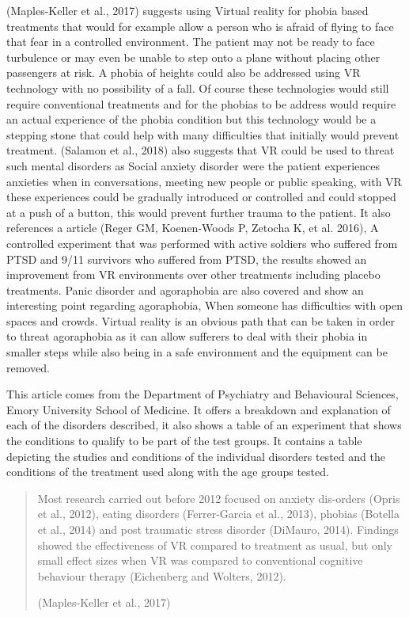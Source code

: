 \documentclass[10pt,journal,compsoc]{IEEEtran}
\begin{document}
	 (Maples-Keller et al., 2017) suggests using Virtual reality for phobia based treatments that would for example allow a person who is afraid of flying to face that fear in a controlled environment. The patient may not be ready to face turbulence or may even be unable to step onto a plane without placing other passengers at risk. A phobia of heights could also be addressed using VR technology with no possibility of a fall. Of course these technologies would still require conventional treatments and for the phobias to be address would require an actual experience of the phobia condition but this technology would be a stepping stone that could help with many difficulties that initially would prevent treatment. (Salamon et al., 2018) also suggests that VR could be used to threat such mental disorders as Social anxiety disorder were the patient experiences anxieties when in conversations, meeting new people or public speaking, with VR these experiences could be  gradually introduced or controlled and could stopped at a push of a button, this would prevent further trauma to the patient. It also references a article (Reger GM, Koenen-Woods P, Zetocha K, et al. 2016), A controlled experiment that was performed with active soldiers who suffered from PTSD and 9/11 survivors who suffered from PTSD, the results showed an improvement from VR environments over other treatments including placebo treatments. Panic disorder and agoraphobia are also covered and show an interesting point regarding agoraphobia, When someone has difficulties with open spaces and crowds. Virtual reality is an obvious path that can be taken in order to threat agoraphobia as it can allow sufferers to deal with their phobia in smaller steps while also being in a safe environment and the equipment can be removed. \newline
	 
	 This article comes from the Department of Psychiatry and Behavioural Sciences, Emory University School of Medicine. It offers a breakdown and explanation of each of the disorders described, it also shows a table of an experiment that shows the conditions to qualify to be part of the test groups. It contains a table depicting the studies and conditions of the individual disorders tested and the conditions of the treatment used along with the age groups tested. \newline

	\begin{quotation}
		 Most research carried out before 2012 focused on anxiety dis-orders (Opris et al., 2012), eating disorders (Ferrer-Garcia et al., 2013), phobias (Botella et al., 2014) and post traumatic stress disorder (DiMauro, 2014). Findings showed the effectiveness of VR compared to treatment as usual, but only small effect sizes when VR was compared to conventional cognitive behaviour therapy (Eichenberg and Wolters, 2012).\newline 
		 
		 (Maples-Keller et al., 2017)
	\end{quotation}
\end{document}
